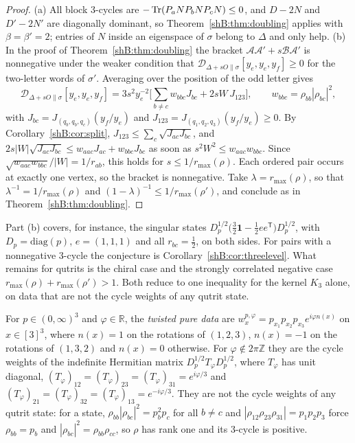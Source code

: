 \begin{proof}
(a) All block $3$-cycles are $-\operatorname{Tr}(P_aNP_bNP_cN)\le0$, and $D-2N$ and $D'-2N'$ are diagonally dominant, so Theorem~\ref{shB:thm:doubling} applies with $\beta=\beta'=2$; entries of $N$ inside an eigenspace of $\sigma$ belong to $\Delta$ and only help.
(b) In the proof of Theorem~\ref{shB:thm:doubling} the bracket $\mathcal A\mathcal A'+s\mathcal B\mathcal A'$ is nonnegative under the weaker condition that $\mathcal D_{\Delta+sO\|\sigma}[y_e,y_e,y_f]\ge0$ for the two-letter words of $\sigma'$. Averaging over the position of the odd letter gives
\[
\mathcal D_{\Delta+sO\|\sigma}[y_e,y_e,y_f]=3s^2y_e^{-2}\Big[\sum_{b\ne c}w_{bbc}J_{bc}+2sW\,J_{123}\Big],\qquad w_{bbc}=\rho_{bb}|\rho_{bc}|^2,
\]
with $J_{bc}=J_{(q_b,q_b,q_c)}(y_f/y_e)$ and $J_{123}=J_{(q_1,q_2,q_3)}(y_f/y_e)\ge0$. By Corollary~\ref{shB:cor:split}, $J_{123}\le\sum_c\sqrt{J_{ac}J_{bc}}$, and $2s|W|\sqrt{J_{ac}J_{bc}}\le w_{aac}J_{ac}+w_{bbc}J_{bc}$ as soon as $s^2W^2\le w_{aac}w_{bbc}$. Since $\sqrt{w_{aac}w_{bbc}}/|W|=1/r_{ab}$, this holds for $s\le1/r_{\max}(\rho)$. Each ordered pair occurs at exactly one vertex, so the bracket is nonnegative. Take $\lambda=r_{\max}(\rho)$, so that $\lambda^{-1}=1/r_{\max}(\rho)$ and $(1-\lambda)^{-1}\le1/r_{\max}(\rho')$, and conclude as in Theorem~\ref{shB:thm:doubling}.
\end{proof}

Part (b) covers, for instance, the singular states $D_p^{1/2}\big(\frac32\mathbf 1-\frac12ee^{\mathsf T}\big)D_p^{1/2}$, with $D_p=\mathrm{diag}(p)$, $e=(1,1,1)$ and all $r_{bc}=\frac12$, on both sides. For pairs with a nonnegative $3$-cycle the conjecture is Corollary~\ref{shB:cor:threelevel}. What remains for qutrits is the chiral case and the strongly correlated negative case $r_{\max}(\rho)+r_{\max}(\rho')>1$. Both reduce to one inequality for the kernel $K_3$ alone, on data that are not the cycle weights of any qutrit state.

For $p\in(0,\infty)^3$ and $\varphi\in\mathbb R$, the \emph{twisted pure data} are $w^{p,\varphi}_x=p_{x_1}p_{x_2}p_{x_3}e^{i\varphi n(x)}$ on $x\in[3]^3$, where $n(x)=1$ on the rotations of $(1,2,3)$, $n(x)=-1$ on the rotations of $(1,3,2)$ and $n(x)=0$ otherwise. For $\varphi\notin2\pi\mathbb Z$ they are the cycle weights of the indefinite Hermitian matrix $D_p^{1/2}T_\varphi D_p^{1/2}$, where $T_\varphi$ has unit diagonal, $(T_\varphi)_{12}=(T_\varphi)_{23}=(T_\varphi)_{31}=e^{i\varphi/3}$ and $(T_\varphi)_{21}=(T_\varphi)_{32}=(T_\varphi)_{13}=e^{-i\varphi/3}$. They are not the cycle weights of any qutrit state: for a state, $\rho_{bb}|\rho_{bc}|^2=p_b^2p_c$ for all $b\ne c$ and $|\rho_{12}\rho_{23}\rho_{31}|=p_1p_2p_3$ force $\rho_{bb}=p_b$ and $|\rho_{bc}|^2=\rho_{bb}\rho_{cc}$, so $\rho$ has rank one and its $3$-cycle is positive.


